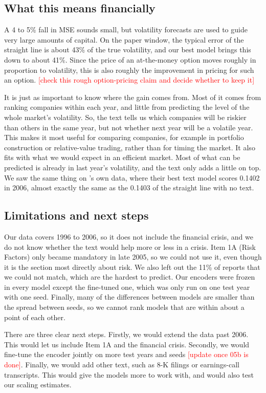 \documentclass[11pt,a4paper]{article}
\newcommand{\placeholder}[1]{\textcolor{red}{[#1]}}
\begin{document}
\subsection{What this means financially}

A 4 to 5\% fall in MSE sounds small, but volatility forecasts are used to guide very large amounts of capital. On the paper window, the typical error of the straight line is about 43\% of the true volatility, and our best model brings this down to about 41\%. Since the price of an at-the-money option moves roughly in proportion to volatility, this is also roughly the improvement in pricing for such an option.  
\placeholder{check this rough option-pricing claim and decide whether to keep it}

It is just as important to know where the gain comes from. Most of it comes from ranking companies within each year, and little from predicting the level of the whole market's volatility. So, the text tells us which companies will be riskier than others in the same year, but not whether next year will be a volatile year. This makes it most useful for comparing companies, for example in portfolio construction or relative-value trading, rather than for timing the market. It also fits with what we would expect in an efficient market. Most of what can be predicted is already in last year's volatility, and the text only adds a little on top. We saw the same thing on \citeauthor{kogan2009}'s own data, where their best text model scores 0.1402 in 2006, almost exactly the same as the 0.1403 of the straight line with no text.

\subsection{Limitations and next steps}

Our data covers 1996 to 2006, so it does not include the financial crisis, and we do not know whether the text would help more or less in a crisis. Item 1A (Risk Factors) only became mandatory in late 2005, so we could not use it, even though it is the section most directly about risk. We also left out the 11\% of reports that we could not match, which are the hardest to predict. Our encoders were frozen in every model except the fine-tuned one, which was only run on one test year with one seed. Finally, many of the differences between models are smaller than the spread between seeds, so we cannot rank models that are within about a point of each other.

There are three clear next steps. Firstly, we would extend the data past 2006. This would let us include Item 1A and the financial crisis. Secondly, we would fine-tune the encoder jointly on more test years and seeds \placeholder{update once 05b is done}. Finally, we would add other text, such as 8-K filings or earnings-call transcripts. This would give the models more to work with, and would also test our scaling estimates.
\end{document}
